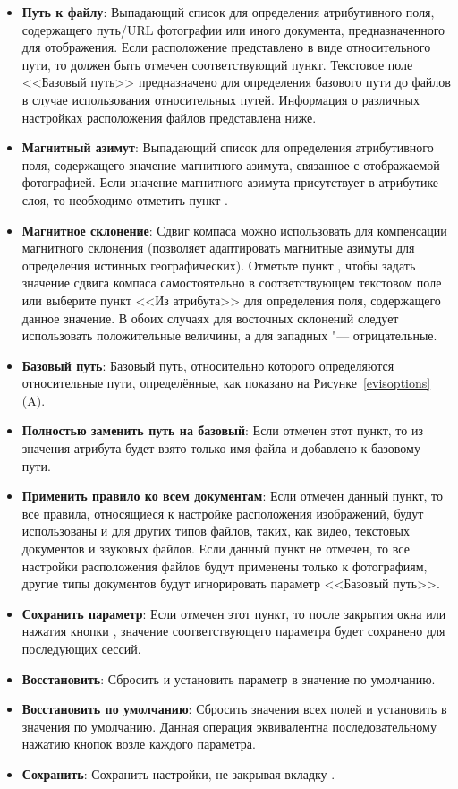 \begin{itemize}[label=--]
\item \textbf{Путь к файлу}: Выпадающий список для определения атрибутивного
поля, содержащего путь/URL фотографии или иного документа,
предназначенного для отображения. Если расположение представлено в виде
относительного пути, то должен быть отмечен соответствующий пункт.
Текстовое поле <<Базовый путь>> предназначено для определения базового пути до
файлов в случае использования относительных путей. Информация о
различных настройках расположения файлов представлена ниже.
\item \textbf{Магнитный азимут}: Выпадающий список для определения
атрибутивного поля, содержащего значение магнитного азимута, связанное с
отображаемой фотографией. Если значение магнитного азимута присутствует в
атрибутике слоя, то необходимо отметить пункт .
\item \textbf{Магнитное склонение}: Сдвиг компаса можно использовать для
компенсации магнитного склонения (позволяет адаптировать магнитные азимуты для
определения истинных географических). Отметьте пункт ,
чтобы задать значение сдвига компаса самостоятельно в соответствующем текстовом
поле или выберите пункт <<Из атрибута>> для определения поля, содержащего данное
значение. В обоих случаях для восточных склонений следует использовать
положительные величины, а для западных "--- отрицательные.
\item \textbf{Базовый путь}: Базовый путь, относительно которого определяются
относительные пути, определённые, как показано на Рисунке~\ref{evisoptions} (A).
\item \textbf{Полностью заменить путь на базовый}: Если отмечен этот пункт,
то из значения атрибута будет взято только имя файла и добавлено к базовому
пути.
\item \textbf{Применить правило ко всем документам}: Если отмечен данный
пункт, то все правила, относящиеся к настройке расположения изображений, будут
использованы и для других типов файлов, таких, как видео, текстовых документов и
звуковых файлов. Если данный пункт не отмечен, то все настройки расположения
файлов будут применены только к фотографиям, другие типы документов будут
игнорировать параметр <<Базовый путь>>.
\item \textbf{Сохранить параметр}: Если отмечен этот пункт, то
после закрытия окна или нажатия кнопки , значение соответствующего
параметра будет сохранено для последующих сессий.
\item \textbf{Восстановить}: Сбросить и установить параметр в значение по
умолчанию.
\item \textbf{Восстановить по умолчанию}: Сбросить значения всех полей и
установить в значения по умолчанию. Данная операция эквивалентна
последовательному нажатию кнопок  возле каждого параметра.
\item \textbf{Сохранить}: Сохранить настройки, не закрывая вкладку
.
\end{itemize}

